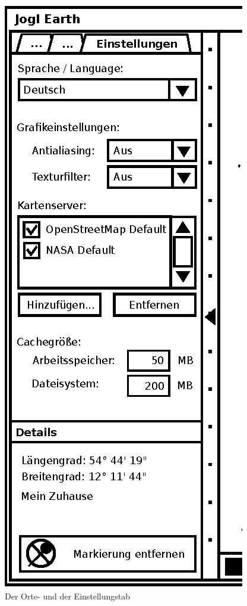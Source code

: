 \documentclass[10pt]{scrreprt}
\begin{document}
\begin{figure}
\begin{minipage}[c]{6cm}
		\includegraphics[scale=0.9]{GUI-Einstellungen.eps}
	\end{minipage}
	\caption{Der Orte- und der Einstellungstab}
\end{figure}
\end{document}
